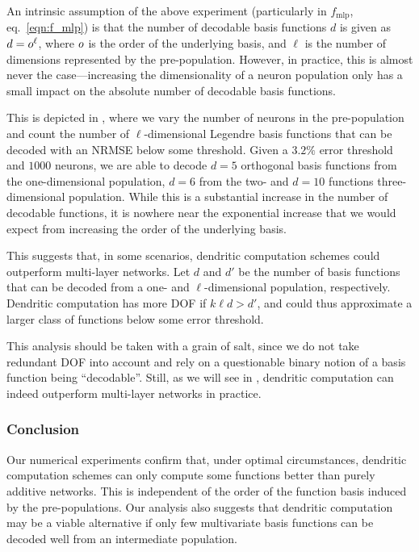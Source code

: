 An intrinsic assumption of the above experiment (particularly in $f_\mathrm{mlp}$, eq.~\ref{eqn:f_mlp}) is that the number of decodable basis functions $d$ is given as $d = o^\ell$, where $o$ is the order of the underlying basis, and $\ell$ is the number of dimensions represented by the pre-population.
However, in practice, this is almost never the case---increasing the dimensionality of a neuron population only has a small impact on the absolute number of decodable basis functions.

This is depicted in , where we vary the number of neurons in the pre-population and count the number of $\ell$-dimensional Legendre basis functions that can be decoded with an NRMSE below some threshold.
Given a $3.2\%$ error threshold and $1000$ neurons, we are able to decode $d = 5$ orthogonal basis functions from the one-dimensional population, $d = 6$ from the two- and $d = 10$ functions three-dimensional population.
While this is a substantial increase in the number of decodable functions, it is nowhere near the exponential increase that we would expect from increasing the order of the underlying basis.

This suggests that, in some scenarios, dendritic computation schemes could outperform multi-layer networks.
Let $d$ and $d'$ be the number of basis functions that can be decoded from a one- and $\ell$-dimensional population, respectively.
Dendritic computation has more DOF if $k \ell d > d'$, and could thus approximate a larger class of functions below some error threshold.

This analysis should be taken with a grain of salt, since we do not take redundant DOF into account and rely on a questionable binary notion of a basis function being \enquote{decodable}.
Still, as we will see in , dendritic computation can indeed outperform multi-layer networks in practice.

\subsubsection{Conclusion}
Our numerical experiments confirm that, under optimal circumstances, dendritic computation schemes can only compute some functions better than purely additive networks.
This is independent of the order of the function basis induced by the pre-populations.
Our analysis also suggests that dendritic computation may be a viable alternative if only few multivariate basis functions can be decoded well from an intermediate population.
